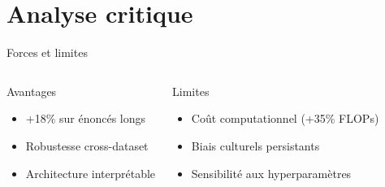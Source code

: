 \documentclass[10pt, aspectratio=169]{beamer} %
\begin{document}
\section{Analyse critique}
\begin{frame}{Forces et limites}
    \begin{columns}
        \begin{block}{Avantages}
            \begin{itemize}
                \item +18\% sur énoncés longs
                \item Robustesse cross-dataset
                \item Architecture interprétable
            \end{itemize}
        \end{block}
        
        \begin{alertblock}{Limites}
            \begin{itemize}
                \item Coût computationnel (+35\% FLOPs)
                \item Biais culturels persistants
                \item Sensibilité aux hyperparamètres
            \end{itemize}
        \end{alertblock}
    \end{columns}
    
    \vspace{1em}
    \centering
    
    \footnotesize
\end{frame}
\end{document}
